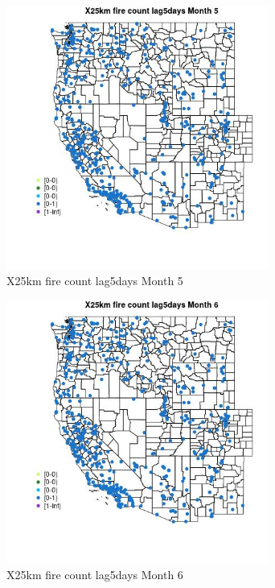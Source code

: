 \begin{figure} 
\centering  
\includegraphics[width=0.77\textwidth]{Code_Outputs/Report_ML_input_PM25_Step4_part_e_de_duplicated_aves_compiled_2019-05-14wNAs_MapObsMo5X25km_fire_count_lag5days.jpg} 
\caption{\label{fig:Report_ML_input_PM25_Step4_part_e_de_duplicated_aves_compiled_2019-05-14wNAsMapObsMo5X25km_fire_count_lag5days}X25km fire count lag5days Month 5} 
\end{figure} 
 

\clearpage 

\begin{figure} 
\centering  
\includegraphics[width=0.77\textwidth]{Code_Outputs/Report_ML_input_PM25_Step4_part_e_de_duplicated_aves_compiled_2019-05-14wNAs_MapObsMo6X25km_fire_count_lag5days.jpg} 
\caption{\label{fig:Report_ML_input_PM25_Step4_part_e_de_duplicated_aves_compiled_2019-05-14wNAsMapObsMo6X25km_fire_count_lag5days}X25km fire count lag5days Month 6} 
\end{figure} 
 

